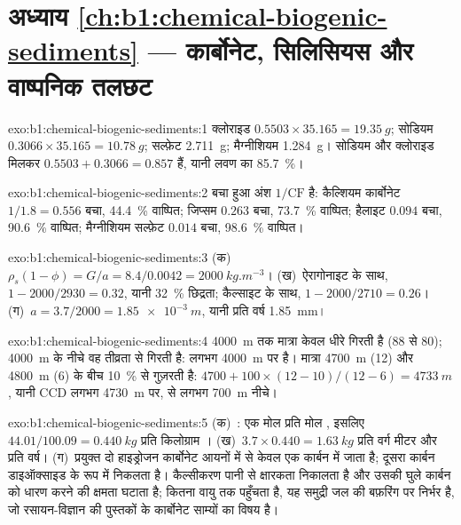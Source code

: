 \section*{अध्याय \ref{ch:b1:chemical-biogenic-sediments} --- कार्बोनेट, सिलिसियस और वाष्पनिक तलछट}

\begin{solution}{exo:b1:chemical-biogenic-sediments:1}
क्लोराइड $0.5503\times35.165 = \qty{19.35}{g}$; सोडियम $0.3066\times35.165 =
\qty{10.78}{g}$; सल्फ़ेट \qty{2.711}{g}; मैग्नीशियम \qty{1.284}{g}। सोडियम और क्लोराइड मिलकर $0.5503 + 0.3066 = 0.857$ हैं, यानी लवण का \qty{85.7}{\%}।
\end{solution}

\begin{solution}{exo:b1:chemical-biogenic-sediments:2}
बचा हुआ अंश $1/\mathrm{CF}$ है: कैल्शियम कार्बोनेट $1/1.8 = 0.556$ बचा, \qty{44.4}{\%} वाष्पित; जिप्सम $0.263$ बचा, \qty{73.7}{\%} वाष्पित; हैलाइट $0.094$ बचा, \qty{90.6}{\%} वाष्पित; मैग्नीशियम सल्फ़ेट $0.014$ बचा, \qty{98.6}{\%} वाष्पित।
\end{solution}

\begin{solution}{exo:b1:chemical-biogenic-sediments:3}
(क)~$\rho_s(1-\phi) = G/a = 8.4/0.0042 = \qty{2000}{kg.m^{-3}}$। (ख)~ऐरागोनाइट के साथ, $1 - 2000/2930 = 0.32$, यानी \qty{32}{\%} छिद्रता; कैल्साइट के साथ, $1 - 2000/2710 = 0.26$। (ग)~$a = 3.7/2000 = \qty{1.85e-3}{m}$, यानी प्रति वर्ष \qty{1.85}{mm}।
\end{solution}

\begin{solution}{exo:b1:chemical-biogenic-sediments:4}
\qty{4000}{m} तक मात्रा केवल धीरे गिरती है (88 से 80); \qty{4000}{m} के नीचे वह तीव्रता से गिरती है:  लगभग \qty{4000}{m} पर है। मात्रा \qty{4700}{m} (12) और \qty{4800}{m} (6) के बीच \qty{10}{\%} से गुज़रती है: $4700 + 100\times(12-10)/(12-6) = \qty{4733}{m}$, यानी CCD लगभग \qty{4730}{m} पर,  से लगभग \qty{700}{m} नीचे।
\end{solution}

\begin{solution}{exo:b1:chemical-biogenic-sediments:5}
(क)~: एक मोल  प्रति मोल , इसलिए $44.01/100.09 = \qty{0.440}{kg}$  प्रति किलोग्राम । (ख)~$3.7\times0.440 = \qty{1.63}{kg}$  प्रति वर्ग मीटर और प्रति वर्ष। (ग)~प्रयुक्त दो हाइड्रोजन कार्बोनेट आयनों में से केवल एक कार्बन  में जाता है; दूसरा कार्बन डाइऑक्साइड के रूप में निकलता है। कैल्सीकरण पानी से क्षारकता निकालता है और उसकी घुले कार्बन को धारण करने की क्षमता घटाता है; कितना  वायु तक पहुँचता है, यह समुद्री जल की बफ़रिंग पर निर्भर है, जो रसायन-विज्ञान की पुस्तकों के कार्बोनेट साम्यों का विषय है।
\end{solution}


